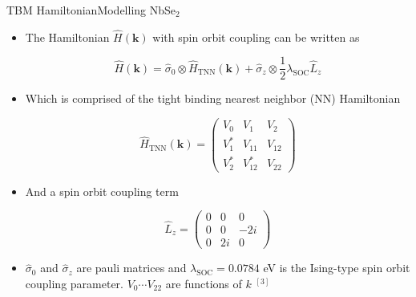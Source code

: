 \documentclass[9pt]{beamer}
\begin{document}
\begin{frame}{TBM Hamiltonian}{Modelling NbSe$_2$}
  \begin{itemize}
    \item{The Hamiltonian $\hat{H}(\boldsymbol{k})$ with spin orbit coupling can be written as

      \begin{equation}
        \hat{H}(\boldsymbol{k})=\hat{\sigma}_{0} \otimes \hat{H}_{\mathrm{TNN}}(\boldsymbol{k})+\hat{\sigma}_{z} \otimes \frac{1}{2} \lambda_{\mathrm{SOC}} \hat{L}_{z}
      \end{equation}
      }

    \item{Which is comprised of the tight binding nearest neighbor (NN) Hamiltonian

      \begin{equation}
        \hat{H}_{\mathrm{TNN}}(\boldsymbol{k})=\left(\begin{array}{ccc}
        V_{0} & V_{1} & V_{2} \\
        V_{1}^{*} & V_{11} & V_{12} \\
        V_{2}^{*} & V_{12}^{*} & V_{22}
        \end{array}\right)
      \end{equation}
      }

    \item{And a spin orbit coupling term

      \begin{equation}
        \hat{L}_{z}=\left(\begin{array}{ccc}
        0 & 0 & 0 \\
        0 & 0 & -2 i \\
        0 & 2 i & 0
        \end{array}\right)
      \end{equation}
    }

  \item $\hat{\sigma}_0$ and $\hat{\sigma}_z$ are pauli matrices and $\lambda_{\text{SOC}}=0.0784$ eV is the Ising-type spin orbit coupling parameter. $V_0 \cdots V_{22}$ are functions of $k$ $^{[3]}$
  \end{itemize}
\end{frame}
\end{document}
